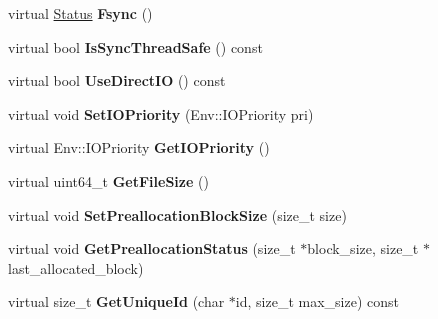 \begin{DoxyCompactItemize}
\item 
virtual \hyperlink{classrocksdb_1_1Status}{Status} {\bfseries Fsync} ()\hypertarget{classrocksdb_1_1WritableFile_aaec9388e46e89e6b6706691e72b1430a}{}\label{classrocksdb_1_1WritableFile_aaec9388e46e89e6b6706691e72b1430a}

\item 
virtual bool {\bfseries Is\+Sync\+Thread\+Safe} () const\hypertarget{classrocksdb_1_1WritableFile_acb30290421a54190c89972fdb345789e}{}\label{classrocksdb_1_1WritableFile_acb30290421a54190c89972fdb345789e}

\item 
virtual bool {\bfseries Use\+Direct\+IO} () const\hypertarget{classrocksdb_1_1WritableFile_ad105cc280bb21db5a0ad150ea2028f0a}{}\label{classrocksdb_1_1WritableFile_ad105cc280bb21db5a0ad150ea2028f0a}

\item 
virtual void {\bfseries Set\+I\+O\+Priority} (Env\+::\+I\+O\+Priority pri)\hypertarget{classrocksdb_1_1WritableFile_a45d7ca5da7c15281ac2d96696706b203}{}\label{classrocksdb_1_1WritableFile_a45d7ca5da7c15281ac2d96696706b203}

\item 
virtual Env\+::\+I\+O\+Priority {\bfseries Get\+I\+O\+Priority} ()\hypertarget{classrocksdb_1_1WritableFile_a84f3a89d8c2f9ed2220b844ed814e153}{}\label{classrocksdb_1_1WritableFile_a84f3a89d8c2f9ed2220b844ed814e153}

\item 
virtual uint64\+\_\+t {\bfseries Get\+File\+Size} ()\hypertarget{classrocksdb_1_1WritableFile_a032f46afa6c012765c1869bcf55f7509}{}\label{classrocksdb_1_1WritableFile_a032f46afa6c012765c1869bcf55f7509}

\item 
virtual void {\bfseries Set\+Preallocation\+Block\+Size} (size\+\_\+t size)\hypertarget{classrocksdb_1_1WritableFile_aca475b532da78d725de650fb452f345d}{}\label{classrocksdb_1_1WritableFile_aca475b532da78d725de650fb452f345d}

\item 
virtual void {\bfseries Get\+Preallocation\+Status} (size\+\_\+t $\ast$block\+\_\+size, size\+\_\+t $\ast$last\+\_\+allocated\+\_\+block)\hypertarget{classrocksdb_1_1WritableFile_adbcb944d86f0b4d769472c01c043aea9}{}\label{classrocksdb_1_1WritableFile_adbcb944d86f0b4d769472c01c043aea9}

\item 
virtual size\+\_\+t {\bfseries Get\+Unique\+Id} (char $\ast$id, size\+\_\+t max\+\_\+size) const\hypertarget{classrocksdb_1_1WritableFile_a5086ed4afc3fc63a0fb43ef2067a2224}{}\label{classrocksdb_1_1WritableFile_a5086ed4afc3fc63a0fb43ef2067a2224}


\end{DoxyCompactItemize}
